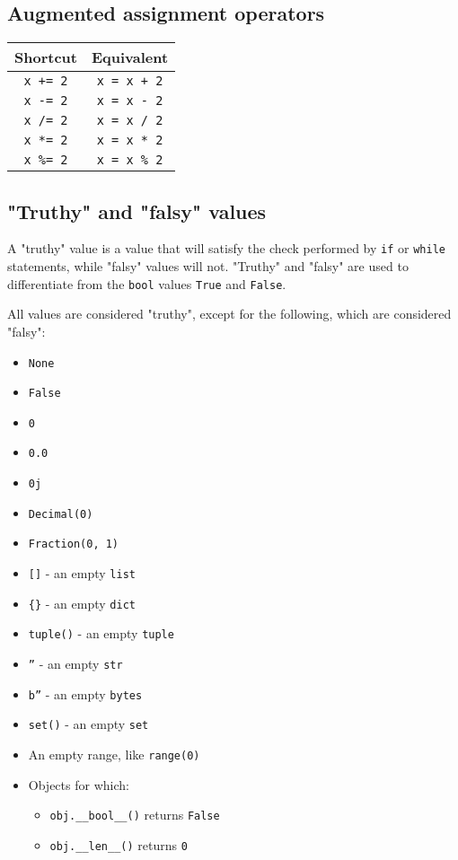 \documentclass[11pt]{article}
\begin{document}
\subsection{Augmented assignment operators}
\label{sec:org47ea036}

\begin{center}
\begin{tabular}{c|c}
Shortcut & Equivalent\\[0pt]
\hline
\texttt{x += 2} & \texttt{x = x + 2}\\[0pt]
\texttt{x -= 2} & \texttt{x = x - 2}\\[0pt]
\texttt{x /= 2} & \texttt{x = x / 2}\\[0pt]
\texttt{x *= 2} & \texttt{x = x * 2}\\[0pt]
\texttt{x \%= 2} & \texttt{x = x \% 2}\\[0pt]
\end{tabular}
\end{center}

 \newpage

\subsection{"Truthy" and "falsy" values}
\label{sec:org757cee3}
\label{orgf40bd7d}
A "truthy" value is a value that will satisfy the check performed by \texttt{if} or \texttt{while} statements, while "falsy" values will not. "Truthy" and "falsy" are used to differentiate from the \texttt{bool} values \texttt{True} and \texttt{False}.

 \noindent All values are considered "truthy", except for the following, which are considered "falsy":
\begin{itemize}
\item \texttt{None}
\item \texttt{False}
\item \texttt{0}
\item \texttt{0.0}
\item \texttt{0j}
\item \texttt{Decimal(0)}
\item \texttt{Fraction(0, 1)}
\item \texttt{[]} - an empty \texttt{list}
\item \texttt{\{\}} - an empty \texttt{dict}
\item \texttt{tuple()} - an empty \texttt{tuple}
\item \texttt{''} - an empty \texttt{str}
\item \texttt{b''} - an empty \texttt{bytes}
\item \texttt{set()} - an empty \texttt{set}
\item An empty range, like \texttt{range(0)}
\item Objects for which:
\begin{itemize}
\item \texttt{obj.\_\_bool\_\_()} returns \texttt{False}
\item \texttt{obj.\_\_len\_\_()} returns \texttt{0}
\end{itemize}
\end{itemize}
\end{document}
